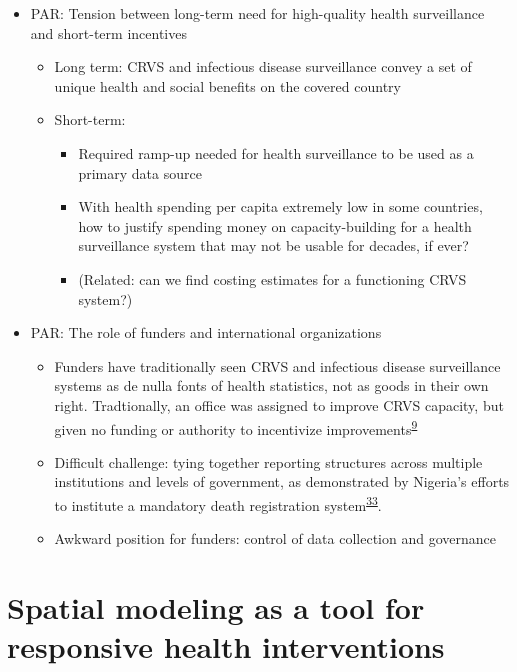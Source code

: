 \documentclass[
]{article}
\providecommand{\tightlist}{%
  \setlength{\itemsep}{0pt}\setlength{\parskip}{0pt}}
\begin{document}
\begin{itemize}
\tightlist
\item
  PAR: Tension between long-term need for high-quality health surveillance and short-term incentives

  \begin{itemize}
  \tightlist
  \item
    Long term: CRVS and infectious disease surveillance convey a set of unique health and
    social benefits on the covered country
  \item
    Short-term:

    \begin{itemize}
    \tightlist
    \item
      Required ramp-up needed for health surveillance to be used as a primary data source
    \item
      With health spending per capita extremely low in some countries, how to
      justify spending money on capacity-building for a health surveillance system
      that may not be usable for decades, if ever?
    \item
      (Related: can we find costing estimates for a functioning CRVS system?)
    \end{itemize}
  \end{itemize}
\item
  PAR: The role of funders and international organizations

  \begin{itemize}
  \tightlist
  \item
    Funders have traditionally seen CRVS and infectious disease surveillance systems as de nulla fonts of health statistics, not as goods in their own right. Tradtionally, an office was assigned to improve CRVS capacity, but given no funding or authority to incentivize improvements\textsuperscript{\protect\hyperlink{ref-AbouZahr2015}{9}}
  \item
    Difficult challenge: tying together reporting structures across multiple institutions and levels of government, as demonstrated by Nigeria's efforts to institute a mandatory death registration system\textsuperscript{\protect\hyperlink{ref-Makinde2020}{33}}.
  \item
    Awkward position for funders: control of data collection and governance
  \end{itemize}
\end{itemize}

\hypertarget{spatial-modeling-as-a-tool-for-responsive-health-interventions}{%
\section{Spatial modeling as a tool for responsive health interventions}\label{spatial-modeling-as-a-tool-for-responsive-health-interventions}}
\end{document}
